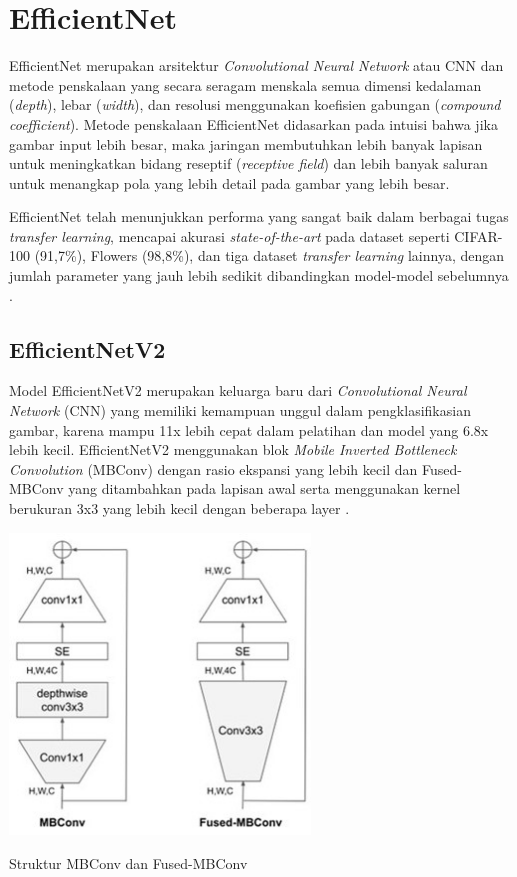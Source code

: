 \section{EfficientNet}
EfficientNet merupakan arsitektur \textit{Convolutional Neural Network} atau CNN dan metode penskalaan yang secara seragam menskala semua dimensi kedalaman (\textit{depth}), lebar (\textit{width}), dan resolusi menggunakan koefisien gabungan (\textit{compound coefficient}). Metode penskalaan EfficientNet didasarkan pada intuisi bahwa jika gambar input lebih besar, maka jaringan membutuhkan lebih banyak lapisan untuk meningkatkan bidang reseptif (\textit{receptive field}) dan lebih banyak saluran untuk menangkap pola yang lebih detail pada gambar yang lebih besar. 

EfficientNet telah menunjukkan performa yang sangat baik dalam berbagai tugas \textit{transfer learning}, mencapai akurasi \textit{state-of-the-art} pada dataset seperti CIFAR-100 (91,7\%), Flowers (98,8\%), dan tiga dataset \textit{transfer learning} lainnya, dengan jumlah parameter yang jauh lebih sedikit dibandingkan model-model sebelumnya \cite{tan2020}. 

\subsection{EfficientNetV2}
Model EfficientNetV2 merupakan keluarga baru dari \textit{Convolutional Neural Network} (CNN) yang memiliki kemampuan unggul dalam pengklasifikasian gambar, karena mampu 11x lebih cepat dalam pelatihan dan model yang 6.8x lebih kecil. EfficientNetV2 menggunakan blok \textit{Mobile Inverted Bottleneck Convolution} (MBConv) dengan rasio ekspansi yang lebih kecil dan Fused-MBConv yang ditambahkan pada lapisan awal serta menggunakan kernel berukuran 3x3 yang lebih kecil dengan beberapa layer \cite{tan2021}.
\begin{afigure}
    \includegraphics[width=0.6\textwidth, center]{images/Picture9.jpg}
    \caption{Struktur MBConv dan Fused-MBConv}
    \label{fig:mbconv} 
\end{afigure}

